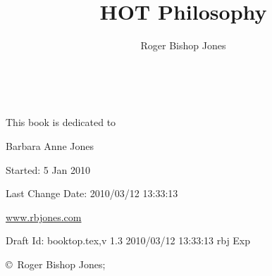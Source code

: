 \documentclass[10pt,titlepage]{book}
\author{Roger Bishop Jones}
\title{HOT Philosophy}
\date{\ }
\begin{document}
\frontmatter

\begin{titlepage}
\maketitle

\vfill

\begin{centering}

{\parskip=0.3in
This book is dedicated to

{ Barbara Anne Jones}
}

\vfill

{\footnotesize

Started: 5 Jan 2010

Last Change $ $Date: 2010/03/12 13:33:13 $ $

\href{http://www.rbjones.com/}{www.rbjones.com}

Draft $ $Id: booktop.tex,v 1.3 2010/03/12 13:33:13 rbj Exp $ $

\copyright\ Roger Bishop Jones;

}%

\end{centering}

\thispagestyle{empty}
\end{titlepage}

{\parskip=0pt\tableofcontents}
\end{document}
